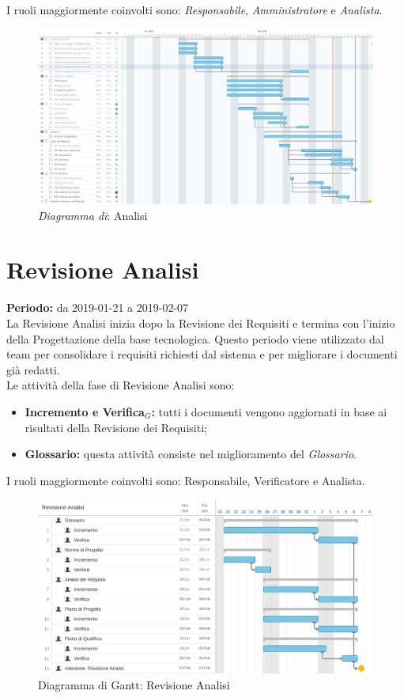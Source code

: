 I ruoli maggiormente coinvolti sono: \textit{Responsabile}, \textit{Amministratore} e \textit{Analista}.
\begin{figure} [h]
    \centering
    \includegraphics[scale=0.3]{./images/analisi.jpg}
    \caption{\textit{Diagramma di}: Analisi }\label{}
\end{figure}
\section{Revisione Analisi}
\textbf{Periodo:} da 2019-01-21 a 2019-02-07\\
La Revisione Analisi inizia dopo la Revisione dei Requisiti e termina con l’inizio della Progettazione della base tecnologica. Questo periodo viene utilizzato dal team per consolidare i requisiti richiesti dal sistema e per migliorare i documenti già redatti.\\
Le attività della fase di Revisione Analisi sono:
\begin{itemize}
    \item \textbf{Incremento e Verifica$_{G}$:} tutti i documenti vengono aggiornati in base ai risultati della Revisione dei Requisiti;
    \item \textbf{Glossario:} questa attività consiste nel miglioramento del \textit{Glossario}.
\end{itemize}
I ruoli maggiormente coinvolti sono: Responsabile, Verificatore e Analista.
\begin{figure} [h]
    \centering
    \includegraphics[scale=0.2]{./images/revisione_analisi.jpg}
    \caption{Diagramma di Gantt: Revisione Analisi }\label{}
\end{figure}
\newpage
